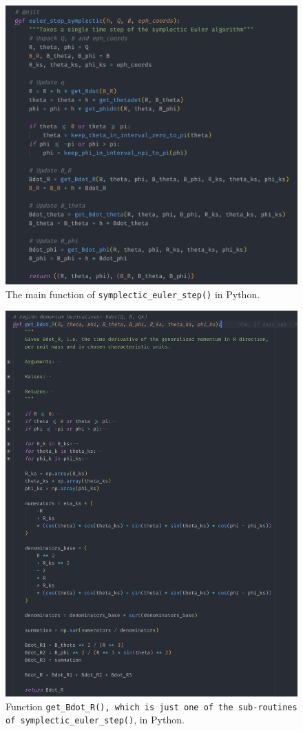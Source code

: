 \begin{figure}[H]
    \centering
    \includegraphics[width=0.90\linewidth]{fig/unit-testing-sympletic-euler-step-python-1.png}
    \caption{The main function of \texttt{symplectic\_euler\_step()} in Python.}
    \label{fig:unit-testing-sympletic-euler-step-python-1}
\end{figure}

\begin{figure}[H]
    \centering
    \includegraphics[width=0.90\linewidth]{fig/unit-testing-sympletic-euler-step-python-2.png}
    \caption{Function \texttt{get\_Bdot\_R(), which is just one of the sub-routines of \texttt{symplectic\_euler\_step()}}, in Python.}
    \label{fig:unit-testing-sympletic-euler-step-python-2}
\end{figure}

